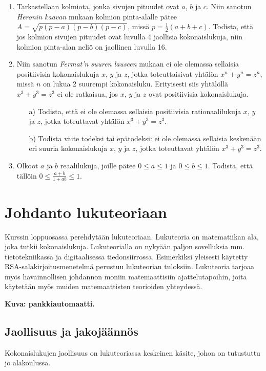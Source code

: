 \begin{enumerate}
\item Tarkastellaan kolmiota, jonka sivujen pituudet ovat
$a$, $b$ ja $c$. Niin sanotun {\em Heronin kaavan} mukaan
kolmion pinta-alalle pätee $A = \sqrt{p(p-a)(p-b)(p-c)}$,
missä $p = \frac{1}{2}(a+b+c)$. Todista, että jos kolmion
sivujen pituudet ovat luvulla 4 jaollisia kokonaislukuja,
niin kolmion pinta-alan neliö on jaollinen luvulla 16.

\item
Niin sanotun {\em Fermat'n suuren lauseen} mukaan ei ole
olemassa sellaisia positiivisia kokonaislukuja $x$, $y$
ja $z$, jotka toteuttaisivat yhtälön $x^{n} + y^{n} = z^{n}$, missä $n$ on lukua 2 suurempi kokonaisluku.
Erityisesti siis yhtälöllä $x^{3} + y^{3} = z^{3}$ ei
ole ratkaisua, jos $x$, $y$ ja $z$ ovat positiivisia
kokonaislukuja.
\begin{itemize}
\item[a)] Todista, että ei ole olemassa sellaisia
positiivisia rationaalilukuja $x$, $y$ ja $z$, jotka
toteuttavat yhtälön $x^{3} + y^{3} = z^{3}$.
\item[b)] Todista väite todeksi tai epätodeksi: ei ole
olemassa sellaisia keskenään eri suuria kokonaislukuja
$x$, $y$ ja $z$, jotka toteuttavat yhtälön $x^{3} + y^{3} = z^{3}$.
\end{itemize}

\item Olkoot $a$ ja $b$ reaalilukuja, joille pätee $0 \le a \le 1$ ja $0 \le b \le 1$. Todista, että tällöin $0 \le \frac{a + b}{1 + ab} \le 1$.

\end{enumerate}


\newpage

\chapter{Johdanto lukuteoriaan}

Kurssin loppuosassa perehdytään lukuteoriaan. Lukuteoria on matematiikan ala, joka tutkii kokonaislukuja. Lukuteorialla on nykyään paljon sovelluksia mm. tietotekniikassa ja digitaalisessa tiedonsiirrossa. Esimerkiksi yleisesti käytetty RSA-sala\-kir\-joi\-tus\-me\-ne\-tel\-mä perustuu lukuteorian tuloksiin. Lukuteoria tarjoaa myös havainnollisen johdannon moniin matemaattisiin ajattelutapoihin, joita käytetään myös muiden matemaattisten teorioiden yhteydessä.

{\bf Kuva: pankkiautomaatti.}

\section{Jaollisuus ja jakojäännös}
\label{jaollisuus}
Kokonaislukujen jaollisuus on lukuteoriassa keskeinen käsite, johon on tutustuttu jo alakoulussa.

